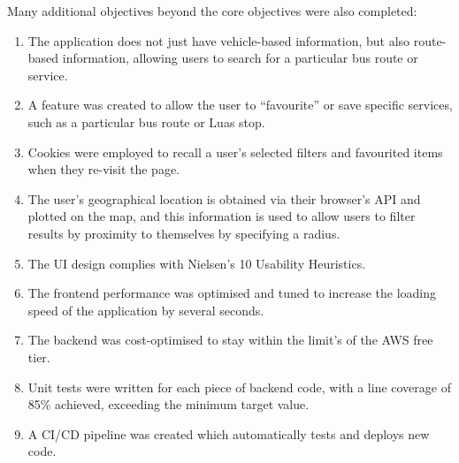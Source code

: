 \documentclass[a4paper,11pt]{report}
\begin{document}
Many additional objectives beyond the core objectives were also completed:
\begin{enumerate}
    \item   The application does not just have vehicle-based information, but also route-based information, allowing users to search for a particular bus route or service.
    
    \item   A feature was created to allow the user to ``favourite'' or save specific services, such as a particular bus route or Luas stop.

    \item   Cookies were employed to recall a user's selected filters and favourited items when they re-visit the page.

    \item   The user's geographical location is obtained via their browser's API and plotted on the map, and this information is used to allow users to filter results by proximity to themselves by specifying a radius.

    \item   The UI design complies with Nielsen's 10 Usability Heuristics.

    \item   The frontend performance was optimised and tuned to increase the loading speed of the application by several seconds.

    \item   The backend was cost-optimised to stay within the limit's of the AWS free tier.


    \item   Unit tests were written for each piece of backend code, with a line coverage of 85\% achieved, exceeding the minimum target value. 

    \item   A CI/CD pipeline was created which automatically tests and deploys new code.
\end{enumerate}
\end{document}
